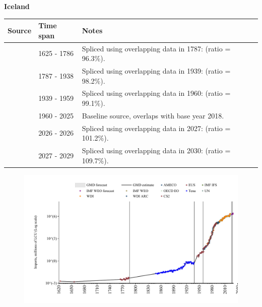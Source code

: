\documentclass[12pt,a4paper,landscape]{article}
\begin{document}
\begin{adjustbox}{max totalsize={\paperwidth}{\paperheight},center}
\begin{minipage}[t][\textheight][t]{\textwidth}
\vspace*{0.5cm}
{}
\begin{center}
{\Large\bfseries Iceland}
\end{center}
\vspace{0.5cm}
\begin{table}[H]
\centering
\small
\begin{tabular}{|l|l|l|}
\hline
\textbf{Source} & \textbf{Time span} & \textbf{Notes} \\
\hline
\rowcolor{white}\cite{CS2_ISL}& 1625 - 1786 &Spliced using overlapping data in 1787: (ratio = 96.3\%).\\
\rowcolor{lightgray}\cite{Tena}& 1787 - 1938 &Spliced using overlapping data in 1939: (ratio = 98.2\%).\\
\rowcolor{white}\cite{CS2_ISL}& 1939 - 1959 &Spliced using overlapping data in 1960: (ratio = 99.1\%).\\
\rowcolor{lightgray}\cite{OECD_EO}& 1960 - 2025 &Baseline source, overlaps with base year 2018.\\
\rowcolor{white}\cite{AMECO}& 2026 - 2026 &Spliced using overlapping data in 2027: (ratio = 101.2\%).\\
\rowcolor{lightgray}\cite{IMF_WEO_forecast}& 2027 - 2029 &Spliced using overlapping data in 2030: (ratio = 109.7\%).\\
\hline
\end{tabular}
\end{table}
\begin{figure}[H]
\centering
\includegraphics[width=\textwidth,height=0.6\textheight,keepaspectratio]{graphs/ISL_imports.pdf}
\end{figure}
\end{minipage}
\end{adjustbox}
\end{document}
